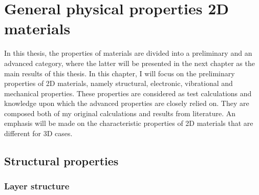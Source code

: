
\chapter{General physical properties 2D materials \label{chap:3}}

\ifpdf
    \graphicspath{{Chapter3/Figs/Raster/}{Chapter3/Figs/PDF/}{Chapter3/Figs/}{Chapter3/Figs/Vector/}}
\else
    \graphicspath{{Chapter3/Figs/Vector/}{Chapter3/Figs/}}
\fi

In this thesis, the properties of materials are divided into a preliminary and an advanced category, where the latter will be presented in the next chapter as the main results of this thesis. In this chapter, I will focus on the preliminary properties of 2D materials, namely structural, electronic, vibrational and mechanical properties. These properties are considered as test calculations and knowledge upon which the advanced properties are closely relied on. They are composed both of my original calculations and results from literature. An emphasis will be made on the characteristic properties of 2D materials that are different for 3D cases.

\section{Structural properties}
\subsection{Layer structure}

